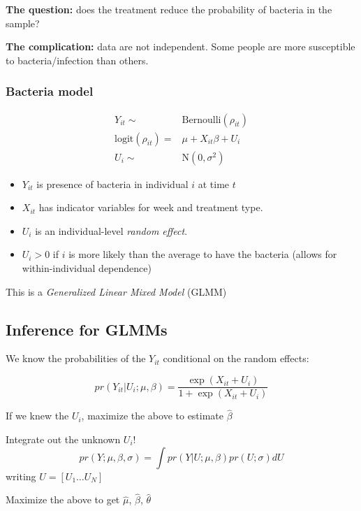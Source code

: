 \documentclass[
  openany]{book}
\providecommand{\tightlist}{%
  \setlength{\itemsep}{0pt}\setlength{\parskip}{0pt}}
\begin{document}
\textbf{The question:} does the treatment reduce the probability of bacteria in the sample?

\textbf{The complication:} data are not independent. Some people are more susceptible to bacteria/infection than others.

\hypertarget{bacteria-model}{%
\subsubsection{Bacteria model}\label{bacteria-model}}

\begin{align*}
Y_{it} \sim & \text{Bernoulli}(\rho_{it})\\
\text{logit}(\rho_{it}) = & \mu + X_{it} \beta + U_i\\
U_i \sim & \text{N}(0, \sigma^2)
\end{align*}

\begin{itemize}
\tightlist
\item
  \(Y_{it}\) is presence of bacteria in individual \(i\) at time \(t\)
\item
  \(X_{it}\) has indicator variables for week and treatment type.
\item
  \(U_i\) is an individual-level \emph{random effect}.
\item
  \(U_i > 0\) if \(i\) is more likely than the average to have the bacteria (allows for within-individual dependence)
\end{itemize}

This is a \emph{Generalized Linear Mixed Model} (GLMM)

\hypertarget{inference-for-glmms}{%
\subsection{Inference for GLMMs}\label{inference-for-glmms}}

We know the probabilities of the \(Y_{it}\) conditional on the random effects:

\[pr(Y_{it} | U_i;\mu,\beta) = \frac{\exp(X_{it} + U_i)}{1+\exp(X_{it} + U_i)}\]

If we knew the \(U_i\), maximize the above to estimate \(\hat\beta\)

Integrate out the unknown \(U_i\)! \[
    pr(Y;\mu,\beta,\sigma) = \int   pr(Y | U; \mu,\beta) pr(U;\sigma) dU
\]writing \(U =[U_1 \ldots U_N]\)

Maximize the above to get \(\hat\mu\), \(\hat\beta\), \(\hat{\theta}\)
\end{document}
